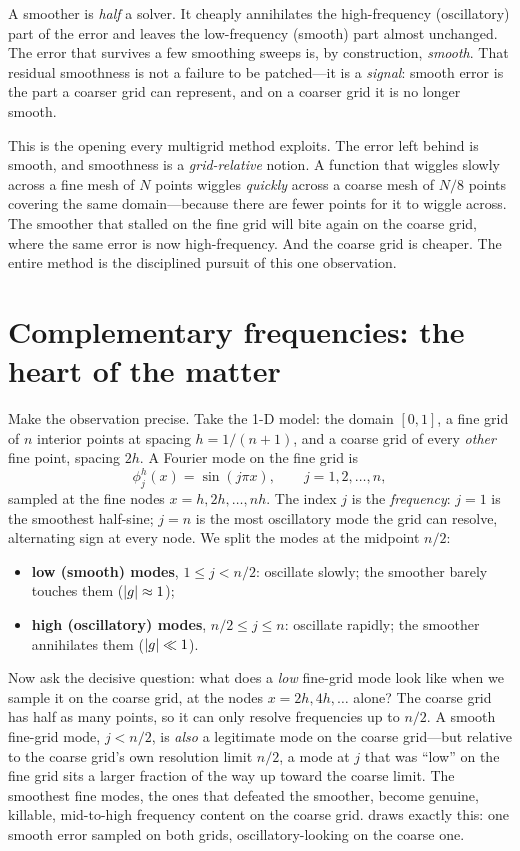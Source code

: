 \begin{keyidea}
A smoother is \emph{half} a solver. It cheaply annihilates the high-frequency
(oscillatory) part of the error and leaves the low-frequency (smooth) part almost
unchanged. The error that survives a few smoothing sweeps is, by construction,
\emph{smooth}. That residual smoothness is not a failure to be patched---it is a
\emph{signal}: smooth error is the part a coarser grid can represent, and on a
coarser grid it is no longer smooth.
\end{keyidea}

This is the opening every multigrid method exploits. The error left behind is smooth,
and smoothness is a \emph{grid-relative} notion. A function that wiggles slowly across
a fine mesh of $N$ points wiggles \emph{quickly} across a coarse mesh of $N/8$ points
covering the same domain---because there are fewer points for it to wiggle across. The
smoother that stalled on the fine grid will bite again on the coarse grid, where the
same error is now high-frequency. And the coarse grid is cheaper. The entire method is
the disciplined pursuit of this one observation.

\section{Complementary frequencies: the heart of the matter}
\label{sec:complementary}

Make the observation precise. Take the 1-D model: the domain $[0,1]$, a fine grid of
$n$ interior points at spacing $h = 1/(n+1)$, and a coarse grid of every \emph{other}
fine point, spacing $2h$. A Fourier mode on the fine grid is
\[
  \phi^h_j(x) = \sin(j\pi x), \qquad j = 1, 2, \dots, n,
\]
sampled at the fine nodes $x = h, 2h, \dots, nh$. The index $j$ is the
\emph{frequency}: $j=1$ is the smoothest half-sine; $j=n$ is the most oscillatory mode
the grid can resolve, alternating sign at every node. We split the modes at the
midpoint $n/2$:
\begin{itemize}[nosep]
\item \textbf{low (smooth) modes}, $1 \le j < n/2$: oscillate slowly; the smoother
  barely touches them ($\lvert g\rvert\approx 1$);
\item \textbf{high (oscillatory) modes}, $n/2 \le j \le n$: oscillate rapidly; the
  smoother annihilates them ($\lvert g\rvert\ll 1$).
\end{itemize}

Now ask the decisive question: what does a \emph{low} fine-grid mode look like when we
sample it on the coarse grid, at the nodes $x = 2h, 4h, \dots$ alone? The coarse grid
has half as many points, so it can only resolve frequencies up to $n/2$. A smooth
fine-grid mode, $j < n/2$, is \emph{also} a legitimate mode on the coarse grid---but
relative to the coarse grid's own resolution limit $n/2$, a mode at $j$ that was
``low'' on the fine grid sits a larger fraction of the way up toward the coarse limit.
The smoothest fine modes, the ones that defeated the smoother, become genuine,
killable, mid-to-high frequency content on the coarse grid. 
draws exactly this: one smooth error sampled on both grids, oscillatory-looking on the
coarse one.

